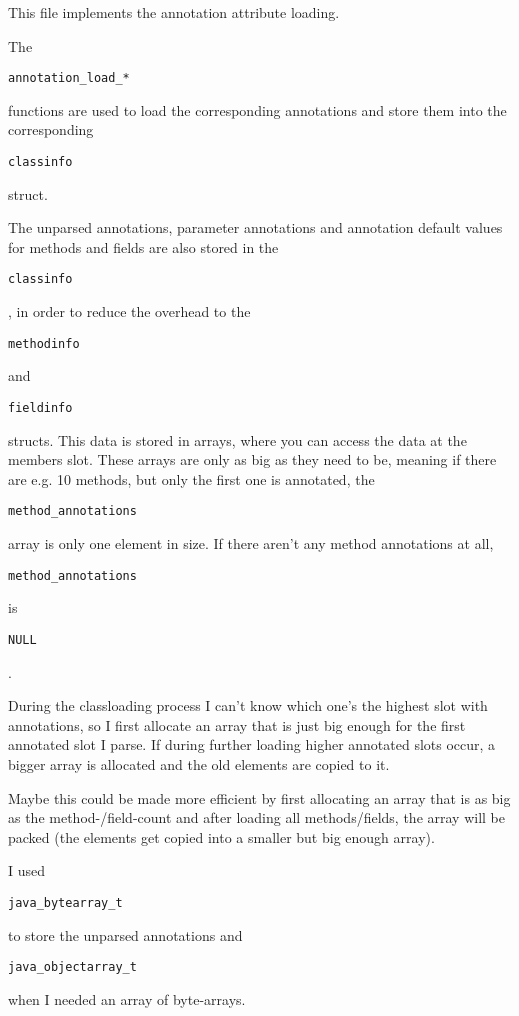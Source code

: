 \documentclass[a4paper, 10pt, titlepage]{scrartcl} %
\begin{document}
This file implements the annotation attribute loading.

The \begin{scriptsize}\verb|annotation_load_|\hspace{0.0pt}\verb|*|\hspace{0.0pt}\verb||\end{scriptsize} functions are used to load the corresponding
annotations and store them into the corresponding \begin{scriptsize}\verb|classinfo|\end{scriptsize} struct.

The unparsed annotations, parameter annotations and annotation default values
for methods and fields are also stored in the \begin{scriptsize}\verb|classinfo|\end{scriptsize}, in order to reduce
the overhead to the \begin{scriptsize}\verb|methodinfo|\end{scriptsize} and \begin{scriptsize}\verb|fieldinfo|\end{scriptsize} structs. This data is
stored in arrays, where you can access the data at the members slot. These arrays
are only as big as they need to be, meaning if there are e.g. 10 methods, but only
the first one is annotated, the \begin{scriptsize}\verb|method_annotations|\end{scriptsize} array is only one
element in size. If there aren't any method annotations at all,
\begin{scriptsize}\verb|method_annotations|\end{scriptsize} is \begin{scriptsize}\verb|NULL|\end{scriptsize}.

During the classloading process I can't know which one's the highest slot with
annotations, so I first allocate an array that is just big enough for the first
annotated slot I parse. If during further loading higher annotated slots occur,
a bigger array is allocated and the old elements are copied to it.

Maybe this could be made more efficient by first allocating an array that is as
big as the method-/field-count and after loading all methods/fields, the array
will be packed (the elements get copied into a smaller but big enough array).

I used \begin{scriptsize}\verb|java_bytearray_t|\end{scriptsize} to store the unparsed annotations and
\begin{scriptsize}\verb|java_objectarray_t|\end{scriptsize} when I needed an array of byte-arrays.
\end{document}
